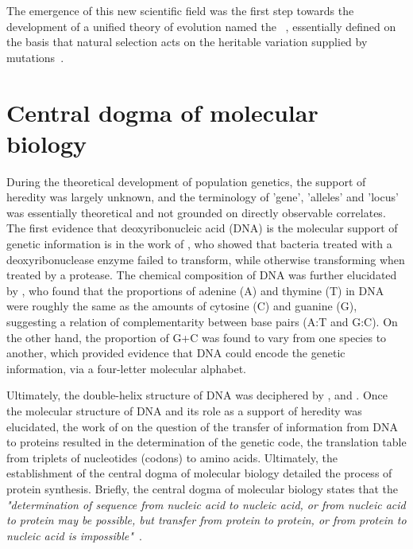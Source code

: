 The emergence of this new scientific field was the first step towards the development of a unified theory of evolution named the ~\citep{huxley1942evolution}, essentially defined on the basis that natural selection acts on the heritable variation supplied by mutations~\citep{mayr1959where,stebbins1966processes,dobzhansky1974chance}.


\section{Central dogma of molecular biology}

During the theoretical development of population genetics, the support of heredity was largely unknown, and the terminology of 'gene', 'alleles' and 'locus' was essentially theoretical and not grounded on directly observable correlates.
The first evidence that deoxyribonucleic acid (\acrshort{DNA}) is the molecular support of genetic information is in the work of \citet{Avery1944}, who showed that bacteria treated with a deoxyribonuclease enzyme failed to transform, while otherwise transforming when treated by a protease.
The chemical composition of \acrshort{DNA} was further elucidated by \citet{Chargaff1950}, who found that the proportions of adenine (A) and thymine (T) in \acrshort{DNA} were roughly the same as the amounts of cytosine (C) and guanine (G), suggesting a relation of complementarity between base pairs (A:T and G:C).
On the other hand, the proportion of G+C was found to vary from one species to another, which provided evidence that \acrshort{DNA} could encode the genetic information, via a four-letter molecular alphabet.

Ultimately, the double-helix structure of \acrshort{DNA} was deciphered by \citet{franklin1953molecular}, \citet{watson1953molecular} and \citet{wilkins1953molecular}.
Once the molecular structure of \acrshort{DNA} and its role as a support of heredity was elucidated, the work of \citet{Crick1958} on the question of the transfer of information from \acrshort{DNA} to proteins resulted in the determination of the genetic code, the translation table from triplets of nucleotides (codons) to amino acids.
Ultimately, the establishment of the central dogma of molecular biology detailed the process of protein synthesis.
Briefly, the central dogma of molecular biology states that the \textit{"determination of sequence from nucleic acid to nucleic acid, or from nucleic acid to protein may be possible, but transfer from protein to protein, or from protein to nucleic acid is impossible"}~\citep{Crick1970}.

